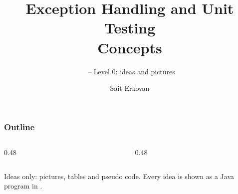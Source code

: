 \documentclass[aspectratio=169,10pt,compress]{beamer}
\title[Exceptions, Tests: Concepts]{
	Exception Handling and Unit Testing\\
	Concepts
}
\subtitle{
	\cisOOO\ -- Level 0: ideas and pictures
}
\author[Erkovan]{Sait Erkovan}
\institute[FCIS]{
	Faculty of Computer and Information Sciences\\
	Yeditepe University
}
\date{{\tiny \hbTimeStamp}}
\begin{document}
\begin{frame}[t,fragile]
	\titlepage
\end{frame}




\begin{frame}[t,fragile] \frametitle{Outline}
	\begin{columns}[T]
		\begin{column}{0.48\textwidth}
			\tableofcontents[sections={1-5}, hideallsubsections]
		\end{column}
		\begin{column}{0.48\textwidth}
			\tableofcontents[sections={6-11}, hideallsubsections]
		\end{column}
	\end{columns}

	\vspace{1em}
	\small Ideas only: pictures, tables and pseudo code. Every idea is shown as a Java program in
	.
\end{frame}




\end{document}
